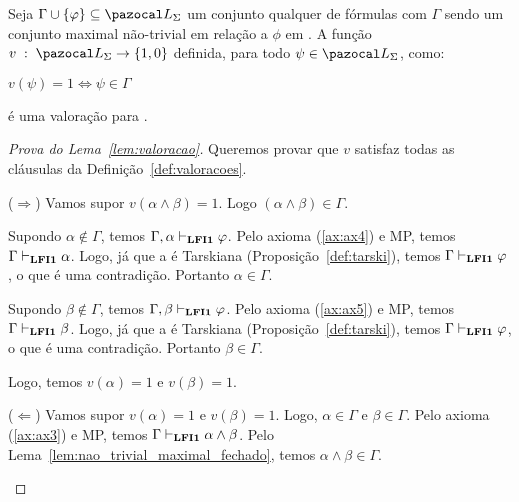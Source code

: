         \begin{lema}\label{lem:valoracao}
            Seja $\Gamma \cup \{\phi\} \subseteq \ling{}$ um conjunto qualquer de fórmulas com $\Gamma$ sendo um conjunto maximal não-trivial em relação a $\phi$ em \lfium{}. A função $v \; : \; \ling \to \{1, 0\}$ definida, para todo $\psi \in \ling$, como:
            \begin{center}
                    $v(\psi) = 1 \Longleftrightarrow \psi \in \Gamma$
            \end{center}

            é uma valoração para \lfium{}.
        \end{lema}

        \begin{proof}[Prova do Lema~\ref{lem:valoracao}]
            Queremos provar que $v$ satisfaz todas as cláusulas da Definição~\ref{def:valoracoes}.

            \begin{provaporcasos}
                

                    \begin{adjustwidth}{1cm}{}
                        \noindent ($\Longrightarrow$) Vamos supor $v(\alpha \land \beta) = 1$. Logo $(\alpha \land \beta) \in \Gamma$. 
                        
                        \noindent Supondo $\alpha \not \in \Gamma$, temos $\Gamma, \alpha \vdash_{{\normalfont\textbf{LFI1}}{}} \varphi$. Pelo axioma (\ref{ax:ax4}) e MP, temos $\Gamma \vdash_{{\normalfont\textbf{LFI1}}{}} \alpha$. Logo, já que a \lfium{} é Tarskiana (Proposição~\ref{def:tarski}), temos $\Gamma \vdash_{{\normalfont\textbf{LFI1}}{}} \varphi$, o que é uma contradição. Portanto $\alpha \in \Gamma$.
            
                        \noindent Supondo $\beta \not \in \Gamma$, temos $\Gamma, \beta \vdash_{{\normalfont\textbf{LFI1}}{}} \varphi$. Pelo axioma (\ref{ax:ax5}) e MP, temos $\Gamma \vdash_{{\normalfont\textbf{LFI1}}{}} \beta$. Logo, já que a \lfium{} é Tarskiana (Proposição~\ref{def:tarski}), temos $\Gamma \vdash_{{\normalfont\textbf{LFI1}}{}} \varphi$, o que é uma contradição. Portanto $\beta \in \Gamma$.
            
                        \noindent Logo, temos $v(\alpha) = 1$ e $v(\beta) = 1$.

                    \end{adjustwidth}

                    \begin{adjustwidth}{1cm}{}
                        \noindent ($\Longleftarrow$) Vamos supor $v(\alpha) = 1$ e $v(\beta) = 1$. Logo, $\alpha \in \Gamma$ e $\beta \in \Gamma$. Pelo axioma (\ref{ax:ax3}) e MP, temos $\Gamma \vdash_{{\normalfont\textbf{LFI1}}{}} \alpha \land \beta$. Pelo Lema~\ref{lem:nao_trivial_maximal_fechado}, temos $\alpha \land \beta \in \Gamma$.


\end{adjustwidth}
\end{provaporcasos}
\end{proof}

